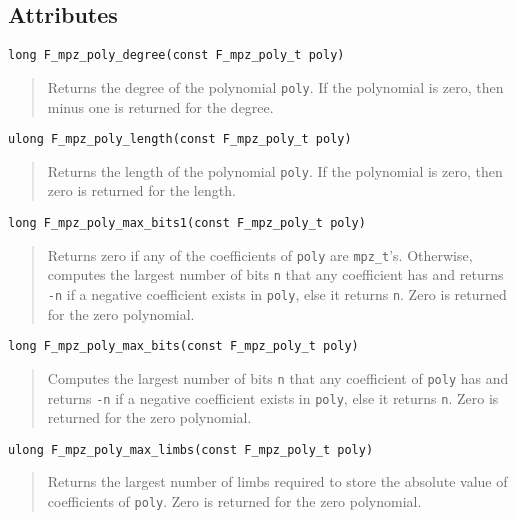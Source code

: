 \documentclass[a4paper,10pt]{article}
\newcommand{\code}{\lstinline}
\begin{document}
\subsection{Attributes}

\begin{lstlisting}
long F_mpz_poly_degree(const F_mpz_poly_t poly)
\end{lstlisting}
\begin{quote}
Returns the degree of the polynomial \code{poly}. If the polynomial is zero, then minus one is returned 
for the degree.
\end{quote}

\begin{lstlisting}
ulong F_mpz_poly_length(const F_mpz_poly_t poly)
\end{lstlisting}
\begin{quote}
Returns the length of the polynomial \code{poly}. If the polynomial is zero, then zero is returned 
for the length.
\end{quote}

\begin{lstlisting}
long F_mpz_poly_max_bits1(const F_mpz_poly_t poly)
\end{lstlisting}
\begin{quote}
Returns zero if any of the coefficients of \code{poly} are \code{mpz_t}'s. Otherwise, computes the 
largest number of bits \code{n} that any coefficient has and returns \code{-n} if a negative coefficient 
exists in \code{poly}, else it returns \code{n}. Zero is returned for the zero polynomial.
\end{quote}

\begin{lstlisting}
long F_mpz_poly_max_bits(const F_mpz_poly_t poly)
\end{lstlisting}
\begin{quote}
Computes the largest number of bits \code{n} that any coefficient of \code{poly} has and returns 
\code{-n} if a negative coefficient exists in \code{poly}, else it returns \code{n}. Zero is 
returned for the zero polynomial.
\end{quote}

\begin{lstlisting}
ulong F_mpz_poly_max_limbs(const F_mpz_poly_t poly)
\end{lstlisting}
\begin{quote}
Returns the largest number of limbs required to store the absolute value of coefficients of \code{poly}. 
Zero is returned for the zero polynomial.
\end{quote}
\end{document}
